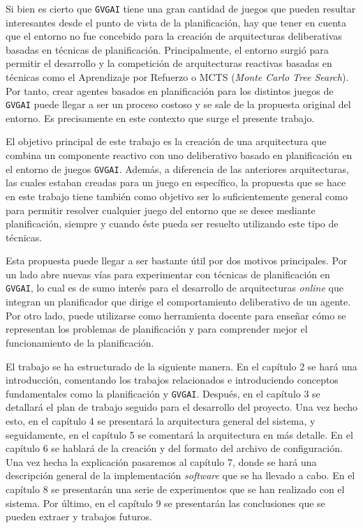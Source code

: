 Si bien es cierto que \texttt{GVGAI} tiene una gran cantidad de juegos que pueden resultar
interesantes desde el punto de vista de la planificación, hay que tener en cuenta que el entorno
no fue concebido para la creación de arquitecturas deliberativas basadas en técnicas de planificación.
Principalmente, el entorno surgió para permitir el desarrollo y la competición de arquitecturas reactivas basadas en
técnicas como el Aprendizaje por Refuerzo o MCTS (\textit{Monte Carlo Tree Search}). Por tanto, crear agentes
basados en planificación para los distintos juegos de \texttt{GVGAI} puede llegar a ser un proceso costoso y
se sale de la propuesta original del entorno. Es precisamente en este contexto que surge el presente trabajo.

El objetivo principal de este trabajo es la creación de una arquitectura que combina un componente
reactivo con uno deliberativo basado en planificación en el entorno de juegos \texttt{GVGAI}. Además,
a diferencia de las anteriores arquitecturas, las cuales estaban creadas para un juego en específico,
la propuesta que se hace en este trabajo tiene también como objetivo ser lo suficientemente general como
para permitir resolver cualquier juego del entorno que se desee mediante planificación, siempre y
cuando éste pueda ser resuelto utilizando este tipo de técnicas.

Esta propuesta puede llegar a ser bastante útil por dos motivos principales. Por un
lado abre nuevas vías para experimentar con técnicas de planificación en \texttt{GVGAI}, lo cual es de
sumo interés para el desarrollo de arquitecturas \textit{online} que integran un planificador que
dirige el comportamiento deliberativo de un agente. Por otro lado, puede utilizarse como herramienta
docente para enseñar cómo se representan los problemas de planificación y para comprender mejor el funcionamiento
de la planificación.

El trabajo se ha estructurado de la siguiente manera. En el capítulo 2 se hará
una introducción, comentando los trabajos relacionados e introduciendo conceptos
fundamentales como la planificación y \texttt{GVGAI}. Después, en el capítulo 3 se
detallará el plan de trabajo seguido para el desarrollo del proyecto. Una vez hecho esto,
en el capítulo 4 se presentará la arquitectura general del sistema, y seguidamente, en el
capítulo 5 se comentará la arquitectura en más detalle. En el capítulo 6 se hablará de la creación
y del formato del archivo de configuración. Una vez hecha la explicación pasaremos al capítulo 7,
donde se hará una descripción general de la implementación \textit{software} que se
ha llevado a cabo. En el capítulo 8 se presentarán una serie de experimentos que
se han realizado con el sistema. Por último, en el capítulo 9 se presentarán las
conclusiones que se pueden extraer y trabajos futuros.